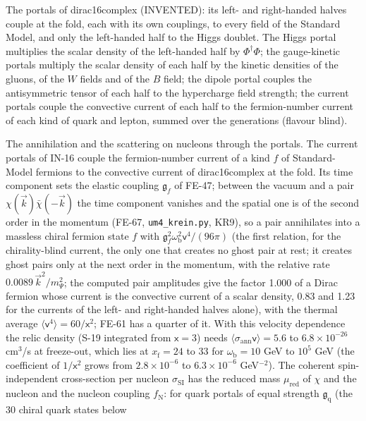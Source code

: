\documentclass[
  10pt,
]{article}
\begin{document}
The portals of dirac16complex (INVENTED): its left- and right-handed
halves couple at the fold, each with its own couplings, to every field
of the Standard Model, and only the left-handed half to the Higgs
doublet. The Higgs portal multiplies the scalar density of the
left-handed half by \(\Phi^\dagger\Phi\); the gauge-kinetic portals
multiply the scalar density of each half by the kinetic densities of the
gluons, of the \(W\) fields and of the \(B\) field; the dipole portal
couples the antisymmetric tensor of each half to the hypercharge field
strength; the current portals couple the convective current of each half
to the fermion-number current of each kind of quark and lepton, summed
over the generations (flavour blind).

The annihilation and the scattering on nucleons through the portals. The
current portals of IN-16 couple the fermion-number current of a kind
\(f\) of Standard-Model fermions to the convective current of
dirac16complex at the fold. Its time component sets the elastic coupling
\(\mathfrak{g}_f\) of FE-47; between the vacuum and a pair
\(\chi(\vec k)\bar\chi(-\vec k)\) the time component vanishes and the
spatial one is of the second order in the momentum (FE-67,
\texttt{um4\_krein.py}, KR9), so a pair annihilates into a massless
chiral fermion state \(f\) with
\(\mathfrak{g}_f^2\omega_{\mathrm{b}}^2\mathsf{v}^4/(96\pi)\) (the first
relation, for the chirality-blind current, the only one that creates no
ghost pair at rest; it creates ghost pairs only at the next order in the
momentum, with the relative rate \(0.0089\,\vec k^2/m_\Psi^2\); the
computed pair amplitudes give the factor 1.000 of a Dirac fermion whose
current is the convective current of a scalar density, 0.83 and 1.23 for
the currents of the left- and right-handed halves alone), with the
thermal average \(\langle\mathsf{v}^4\rangle = 60/\mathsf{x}^2\); FE-61
has a quarter of it. With this velocity dependence the relic density
(S-19 integrated from \(\mathsf{x} = 3\)) needs
\(\langle\sigma_{\mathrm{ann}}\mathsf{v}\rangle = 5.6\) to
\(6.8\times10^{-26}\) cm\(^3\)/s at freeze-out, which lies at
\(x_{\mathrm{f}} = 24\) to 33 for \(\omega_{\mathrm{b}} = 10\) GeV to
\(10^5\) GeV (the coefficient of \(1/\mathsf{x}^2\) grows from
\(2.8\times10^{-6}\) to \(6.3\times10^{-6}\) GeV\(^{-2}\)). The coherent
spin-independent cross-section per nucleon \(\sigma_{\mathrm{SI}}\) has
the reduced mass \(\mu_{\mathrm{red}}\) of \(\chi\) and the nucleon and
the nucleon coupling \(f_{\mathrm{N}}\): for quark portals of equal
strength \(\mathfrak{g}_{\mathrm{q}}\) (the 30 chiral quark states below
\end{document}
